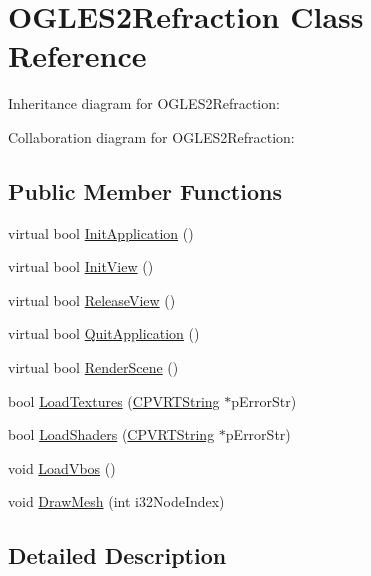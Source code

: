 \hypertarget{class_o_g_l_e_s2_refraction}{\section{O\+G\+L\+E\+S2\+Refraction Class Reference}
\label{class_o_g_l_e_s2_refraction}
}


Inheritance diagram for O\+G\+L\+E\+S2\+Refraction\+:


Collaboration diagram for O\+G\+L\+E\+S2\+Refraction\+:
\subsection*{Public Member Functions}
\begin{DoxyCompactItemize}
\item 
virtual bool \hyperlink{class_o_g_l_e_s2_refraction_aaa4ba786700811862abf4dfc117bd47a}{Init\+Application} ()
\item 
virtual bool \hyperlink{class_o_g_l_e_s2_refraction_a3f7495e1a9ea4a6f5a053d9011a1533d}{Init\+View} ()
\item 
virtual bool \hyperlink{class_o_g_l_e_s2_refraction_ab46366d4aad38f11e9d1c4f59fcb5871}{Release\+View} ()
\item 
virtual bool \hyperlink{class_o_g_l_e_s2_refraction_ac5717ff0e3f995437ce684970e5d0162}{Quit\+Application} ()
\item 
virtual bool \hyperlink{class_o_g_l_e_s2_refraction_af5af4bf7ecc3b1eb6c2da773e29fa5b0}{Render\+Scene} ()
\item 
bool \hyperlink{class_o_g_l_e_s2_refraction_a88df3b93c922ba9fcc91361aa7c5f818}{Load\+Textures} (\hyperlink{class_c_p_v_r_t_string}{C\+P\+V\+R\+T\+String} $\ast$p\+Error\+Str)
\item 
bool \hyperlink{class_o_g_l_e_s2_refraction_a6543c152bc273895419af65403647a39}{Load\+Shaders} (\hyperlink{class_c_p_v_r_t_string}{C\+P\+V\+R\+T\+String} $\ast$p\+Error\+Str)
\item 
void \hyperlink{class_o_g_l_e_s2_refraction_a233152489bc146c58c45a260f2612e9a}{Load\+Vbos} ()
\item 
void \hyperlink{class_o_g_l_e_s2_refraction_a287b491882b8fa5141dfd79adb884b25}{Draw\+Mesh} (int i32\+Node\+Index)
\end{DoxyCompactItemize}


\subsection{Detailed Description}


